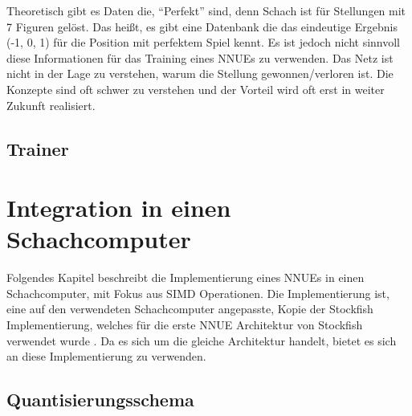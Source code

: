 Theoretisch gibt es Daten die, \enquote{Perfekt} sind, denn Schach ist für Stellungen mit 7 Figuren gelöst. Das heißt, es gibt eine Datenbank die das eindeutige Ergebnis (-1, 0, 1) für die Position mit perfektem Spiel kennt. Es ist jedoch nicht sinnvoll diese Informationen für das Training eines \acp{NNUE} zu verwenden. Das Netz ist nicht in der Lage zu verstehen, warum die Stellung gewonnen/verloren ist. Die Konzepte sind oft schwer zu verstehen und der Vorteil wird oft erst in weiter Zukunft realisiert.

\subsection{Trainer}


\cite{Zeiler2012}



\section{Integration in einen Schachcomputer}
\label{chap:integration}

Folgendes Kapitel beschreibt die Implementierung eines \acp{NNUE} in einen Schachcomputer, mit Fokus aus \ac{SIMD} Operationen. Die Implementierung ist, eine auf den verwendeten Schachcomputer angepasste, Kopie der Stockfish Implementierung, welches für die erste \ac{NNUE} Architektur von Stockfish verwendet wurde \cite{StockfishRepo}. Da es sich um die gleiche Architektur handelt, bietet es sich an diese Implementierung zu verwenden.

\subsection{Quantisierungsschema}

